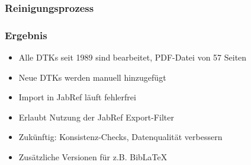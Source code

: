 \documentclass[ngerman]{beamer}
\begin{document}
\begin{frame}
\frametitle{Reinigungsprozess}



\end{frame}

\begin{frame}
\frametitle{Ergebnis}

\begin{itemize}
\item Alle DTKs seit 1989 sind bearbeitet, PDF-Datei von 57 Seiten
\item Neue DTKs werden manuell hinzugefügt
\item Import in JabRef läuft fehlerfrei
\item Erlaubt Nutzung der JabRef Export-Filter
\item Zukünftig: Konsistenz-Checks, Datenqualität verbessern
\item Zusätzliche Versionen für z.B. Bib\LaTeX
\end{itemize}
\end{frame}

{

}
\end{document}
